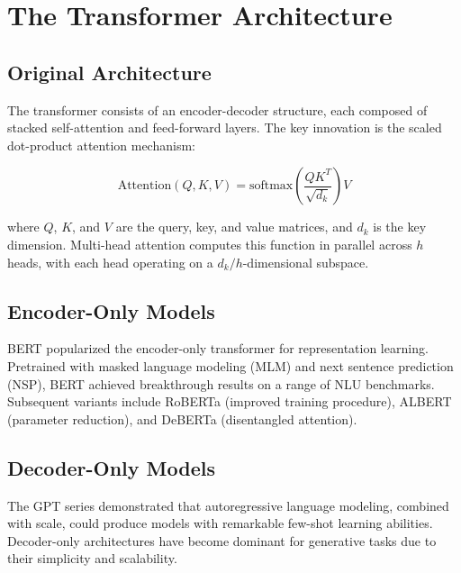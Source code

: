 \documentclass[
    language=english,
    doctype=review-article,
    institution=none,
]{../../omnilatex}
\begin{document}
\section{The Transformer Architecture}
\label{sec:architecture}

\subsection{Original Architecture}

The transformer \cite{vaswani2017attention} consists of an encoder-decoder
structure, each composed of stacked self-attention and feed-forward layers.
The key innovation is the scaled dot-product attention mechanism:

\begin{equation}
    \text{Attention}(Q, K, V) = \text{softmax}\left(\frac{QK^T}{\sqrt{d_k}}\right) V
    \label{eq:attention}
\end{equation}

where $Q$, $K$, and $V$ are the query, key, and value matrices, and $d_k$
is the key dimension. Multi-head attention computes this function in parallel
across $h$ heads, with each head operating on a $d_k/h$-dimensional subspace.

\subsection{Encoder-Only Models}

BERT \cite{devlin2018bert} popularized the encoder-only transformer for
representation learning. Pretrained with masked language modeling (MLM) and
next sentence prediction (NSP), BERT achieved breakthrough results on a
range of NLU benchmarks. Subsequent variants include RoBERTa \cite{liu2019roberta}
(improved training procedure), ALBERT \cite{lan2019albert} (parameter
reduction), and DeBERTa \cite{he2020deberta} (disentangled attention).

\subsection{Decoder-Only Models}

The GPT series \cite{radford2019language,brown2020language} demonstrated that
autoregressive language modeling, combined with scale, could produce models
with remarkable few-shot learning abilities. Decoder-only architectures have
become dominant for generative tasks due to their simplicity and scalability.
\end{document}
